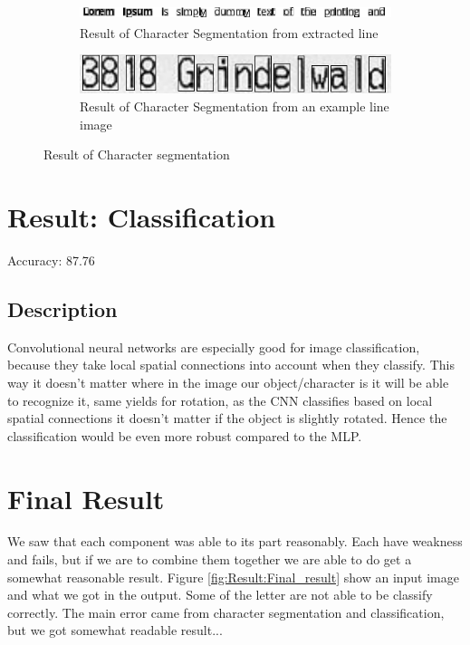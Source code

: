 \documentclass[Report.tex]{subfiles}
\begin{document}
\begin{figure}[H]
  \begin{subfigure}[t]{\textwidth}
    \centering
    \includegraphics[height=0.45cm]{res/segment_letter1.png}
    \caption{Result of Character Segmentation from extracted line}
  \end{subfigure}
  \begin{subfigure}[t]{\textwidth}
    \centering
    \includegraphics[width=12cm]{res/segment_letter2.png}
    \caption{Result of Character Segmentation from an example line image}
  \end{subfigure}
  \caption{Result of Character segmentation}
  \label{fig:Character_segmentation}
\end{figure}

\section{Result: Classification}
\begin{flushleft}
Accuracy: 87.76 %
\end{flushleft}

\subsection{Description}
\begin{flushleft}
  Convolutional neural networks are especially good for image
  classification, because they take local spatial connections into account when
  they classify. This way it doesn't matter where in the image our
  object/character is it will be able to recognize it, same yields for rotation,
  as the CNN classifies based on local spatial connections it doesn't matter if
  the object is slightly rotated. Hence the classification would be even more robust
  compared to the MLP.
\end{flushleft}

\section{Final Result}
We saw that each component was able to its part reasonably. Each have weakness and fails, but if we are to combine them together we are able to do get a somewhat reasonable result. Figure \ref{fig:Result:Final_result} show an input image and what we got in the output. Some of the letter are not able to be classify correctly. The main error came from character segmentation and classification, but we got somewhat readable result... 
\end{document}
